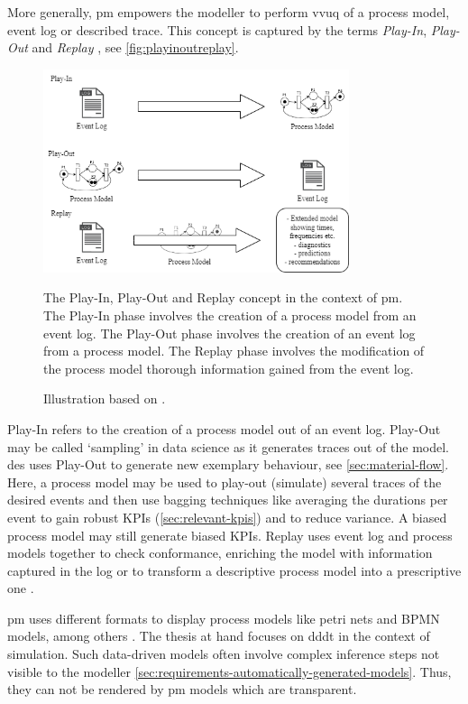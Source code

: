 More generally, \gls{pm} empowers the modeller to perform \gls{vvuq} of a process model, event log or described trace. This concept is captured by the terms \textit{Play-In}, \textit{Play-Out} and \textit{Replay} \autocite{damm2001lscs}, see \autoref{fig:playinoutreplay}.

\begin{figure}[htbp]
  \centering
  \includegraphics[width=0.8\textwidth]{figures/playinplayoutreplay.png}
  \caption[Process Model Usages]{The Play-In, Play-Out and Replay concept in the context of \gls{pm}. The Play-In phase involves the creation of a process model from an event log. The Play-Out phase involves the creation of an event log from a process model. The Replay phase involves the modification of the process model thorough information gained from the event log.}
  \label{fig:playinoutreplay}
  \caption*{Illustration based on \autocite{damm2001lscs}.}
\end{figure}

Play-In refers to the creation of a process model out of an event log. Play-Out may be called `sampling' in data science as it generates traces out of the model. \gls{des} uses Play-Out to generate new exemplary behaviour, see \autoref{sec:material-flow}. Here, a process model may be used to play-out (simulate) several traces of the desired events and then use bagging techniques like averaging the durations per event to gain robust KPIs (\autoref{sec:relevant-kpis}) and to reduce variance. A biased process model may still generate biased KPIs. Replay uses event log and process models together to check conformance, enriching the model with information captured in the log or to transform a descriptive process model into a prescriptive one \autocite{van2016data}.

\gls{pm} uses different formats to display process models like petri nets and BPMN models, among others \autocite{vanderAalst2012}. The thesis at hand focuses on \gls{dddt} in the context of simulation. Such data-driven models often involve complex inference steps not visible to the modeller \autoref{sec:requirements-automatically-generated-models}. Thus, they can not be rendered by \gls{pm} models which are transparent.

